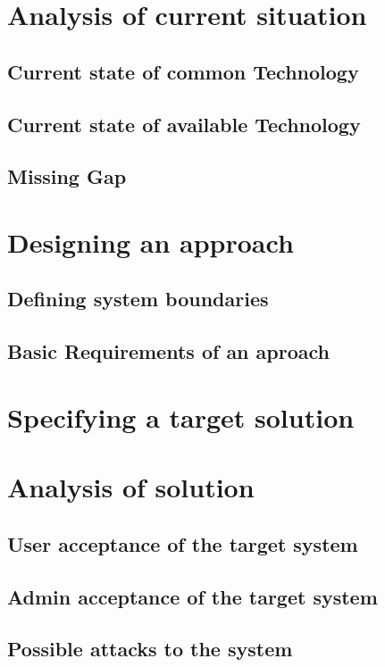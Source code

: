 \documentclass[11pt,a4paper]{book}
\begin{document}
\chapter{Analysis of current situation\label{chap:analysis}}
\section{Current state of common Technology}
\section{Current state of available Technology}
\section{Missing Gap}


\chapter{Designing an approach}
\section{Defining system boundaries}
\section{Basic Requirements of an aproach}

\chapter{Specifying a target solution}

\chapter{Analysis of solution}
\section{User acceptance of the target system}
\section{Admin acceptance of the target system}
\section{Possible attacks to the system}
\end{document}
